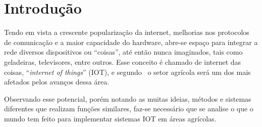 \documentclass[
article,			%
12pt,				%
oneside,			%
a4paper,			%
english,			%
brazil,				%
sumario=tradicional
]{abntex2}
\begin{document}


\textual
\section{Introdução}

Tendo em vista a crescente popularização da internet, melhorias nos protocolos de comunicação e a maior capacidade do hardware, abre-se espaço para integrar a rede diversos dispositivos ou ``coisas'', até então nunca imaginados, tais como geladeiras, televisores, entre outros. Esse conceito é chamado de internet das coisas, ``\textit{internet of things}'' (IOT), e segundo~\citeauthor{5} o setor agrícola será um dos mais afetados pelos avanços dessa área.

Observando esse potencial, porém notando as muitas ideias, métodos e sistemas diferentes que realizam funções similares, faz-se necessário que se analise o que o mundo tem feito para implementar sistemas IOT em áreas agrícolas.
\end{document}
